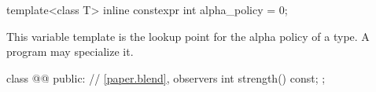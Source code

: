 %
\begin{itemdecl}
template<class T> inline constexpr int alpha_policy = 0;
\end{itemdecl}

\begin{itemdescr}
\pnum
\remarks
This variable template is the lookup point for the alpha policy of a type. A program may specialize it.
\end{itemdescr}

\begin{codeblock}
class @@ {
public:
  // \ref{paper.blend}, observers
  int strength() const;
};
\end{codeblock}
